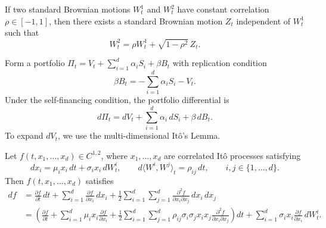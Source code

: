 \begin{note}
    If two standard Brownian motions $W_t^1$ and $W_t^2$ have constant correlation $\rho \in [-1, 1]$, then there exists a standard Brownian motion $Z_t$ independent of $W_t^1$ such that
    \[
        W_t^2 = \rho W_t^1 + \sqrt{1 - \rho^2}\,Z_t.
    \]
\end{note}

Form a portfolio $\Pi_t = V_t + \sum_{i=1}^d \alpha_i S_i + \beta B_t$ with replication condition
\[
    \beta B_t = -\sum_{i=1}^d \alpha_i S_i - V_t.
\]
Under the self-financing condition, the portfolio differential is
\[
    d\Pi_t = dV_t + \sum_{i=1}^d \alpha_i\,dS_i + \beta\,dB_t.
\]
To expand $dV_t$, we use the multi-dimensional It\^o's Lemma.

\begin{theorem}
    \label{thm:ch04-multi-ito}
    Let $f(t, x_1, \dots, x_d) \in C^{1,2}$, where $x_1, \dots, x_d$ are correlated It\^o processes satisfying
    \[
        dx_i = \mu_i x_i\,dt + \sigma_i x_i\,dW_t^i, \qquad
        d\langle W^i, W^j \rangle_t = \rho_{ij}\,dt, \qquad i, j \in \{1, \dots, d\}.
    \]
    Then $f(t, x_1, \dots, x_d)$ satisfies
    \begin{align*}
        df &= \frac{\partial f}{\partial t}\,dt + \sum_{i=1}^d \frac{\partial f}{\partial x_i}\,dx_i + \frac{1}{2}\sum_{i=1}^d \sum_{j=1}^d \frac{\partial^2 f}{\partial x_i \partial x_j}\,dx_i\,dx_j \\
        &= \left(\frac{\partial f}{\partial t} + \sum_{i=1}^d \mu_i x_i \frac{\partial f}{\partial x_i} + \frac{1}{2}\sum_{i=1}^d \sum_{j=1}^d \rho_{ij}\sigma_i \sigma_j x_i x_j \frac{\partial^2 f}{\partial x_i \partial x_j}\right)dt + \sum_{i=1}^d \sigma_i x_i \frac{\partial f}{\partial x_i}\,dW_t^i.
    \end{align*}
\end{theorem}

